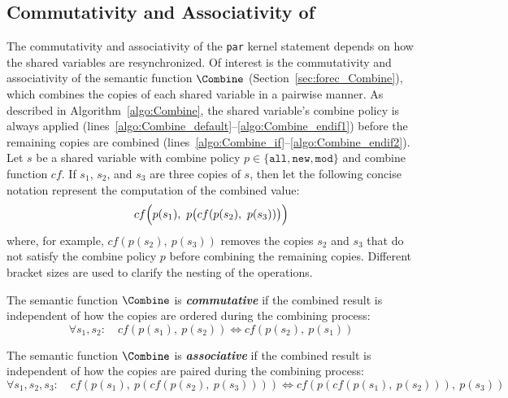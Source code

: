 \subsection{Commutativity and Associativity of }
The commutativity and associativity of the \verb$par$ kernel statement
depends on how the shared variables are resynchronized. Of interest is the 
commutativity and associativity of the semantic function $\Combine$ 
(Section~\ref{sec:forec_Combine}), which combines the copies of each 
shared variable in a pairwise manner. As described in Algorithm~\ref{algo:Combine}, 
the shared variable's combine policy is always applied (lines~\ref{algo:Combine_default}--\ref{algo:Combine_endif1}) 
before the remaining copies are combined (lines~\ref{algo:Combine_if}--\ref{algo:Combine_endif2}). 
Let $s$ be a shared variable with 
combine policy $p \in \{\mathtt{all}, \mathtt{new}, \mathtt{mod}\}$ 
and combine function $cf$. If $s_1$, $s_2$, and $s_3$ are three copies 
of $s$, then let the following concise notation represent the computation
of the combined value:
\begin{equation*}
	cf \Bigl(p(s_1),~p \bigl(cf(p(s_2),~p(s_3))\bigr)\Bigr)
\end{equation*}
where, for example, $cf(p(s_2),~p(s_3))$ removes the copies 
$s_2$ and $s_3$ that do not satisfy the combine policy $p$
before combining the remaining copies. Different bracket sizes 
are used to clarify the nesting of the operations.

\begin{definition}
	\label{def:commutative_combine}
	The semantic function $\Combine$ is \emph{\textbf{commutative}} if the combined 
	result is independent of how the copies are 
	ordered during the combining process:
	\begin{equation*}
		\forall s_1, s_2:
		\quad
		cf(p(s_1),~p(s_2))
		\Longleftrightarrow
		cf(p(s_2),~p(s_1))
	\end{equation*}
\end{definition}

\begin{definition}
	\label{def:associative_combine}
	The semantic function $\Combine$ is \emph{\textbf{associative}} if the combined 
	result is independent of how the copies are 
	paired during the combining process:
	\begin{equation*}
		\forall s_1, s_2, s_3:
		\quad
		cf(p(s_1),~p(cf(p(s_2),~p(s_3))))
		\Longleftrightarrow
		cf(p(cf(p(s_1),~p(s_2))),~p(s_3))
	\end{equation*}
\end{definition}


